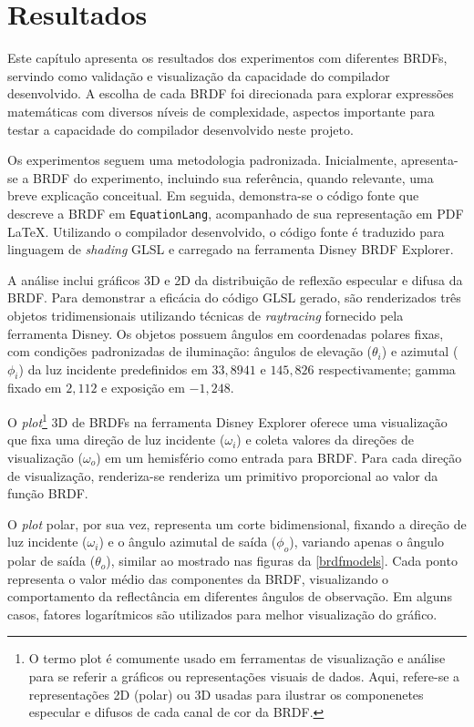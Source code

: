 \chapter{Resultados}
\label{chapter.resultados}


Este capítulo apresenta os resultados dos experimentos com diferentes BRDFs, servindo como validação e visualização da capacidade do compilador desenvolvido. A escolha de cada BRDF foi direcionada para explorar expressões matemáticas com diversos níveis de complexidade, aspectos importante para testar a capacidade do compilador desenvolvido neste projeto.

Os experimentos seguem uma metodologia padronizada. Inicialmente, apresenta-se a BRDF do experimento, incluindo sua referência, quando relevante, uma breve explicação conceitual. Em seguida, demonstra-se o código fonte que descreve a BRDF em \texttt{EquationLang}, acompanhado de sua representação em PDF \LaTeX{}. Utilizando o compilador desenvolvido, o código fonte é traduzido para linguagem de \textit{shading} GLSL e carregado na ferramenta Disney BRDF Explorer.

A análise inclui gráficos 3D e 2D da distribuição de reflexão especular e difusa da BRDF. Para demonstrar a eficácia do código GLSL gerado, são renderizados três objetos tridimensionais utilizando técnicas de \textit{raytracing} fornecido pela ferramenta Disney. Os objetos possuem ângulos em coordenadas polares fixas, com condições padronizadas de iluminação: ângulos de elevação ($\theta_i$) e azimutal ($\phi_i$) da luz incidente predefinidos em $33,8941$ e $145,826$ respectivamente; gamma fixado em $2,112$ e exposição em $-1,248$.

O \textit{plot}\footnote{O termo plot é comumente usado em ferramentas de visualização e análise para se referir a gráficos ou representações visuais de dados. Aqui, refere-se a representações 2D (polar) ou 3D usadas para ilustrar os componenetes especular e difusos de cada canal de cor da BRDF.} 3D de BRDFs na ferramenta Disney Explorer oferece uma visualização que fixa uma direção de luz incidente ($\omega_i$) e coleta valores da direções de visualização ($\omega_o$) em um hemisfério como entrada para BRDF. Para cada direção de visualização, renderiza-se renderiza um primitivo proporcional ao valor da função BRDF.

O \textit{plot} polar, por sua vez, representa um corte bidimensional, fixando a direção de luz incidente ($\omega_i$) e o ângulo azimutal de saída ($\phi_o$), variando apenas o ângulo polar de saída ($\theta_o$), similar ao mostrado nas figuras da \autoref{brdfmodels}. Cada ponto representa o valor médio das componentes da BRDF, visualizando o comportamento da reflectância em diferentes ângulos de observação. Em alguns casos, fatores logarítmicos são utilizados para melhor visualização do gráfico.

